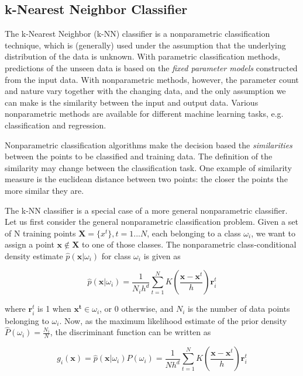 \subsection{k-Nearest Neighbor Classifier}
The k-Nearest Neighbor (k-NN) classifier is a nonparametric classification technique, which is (generally) used under the assumption that the underlying distribution of the data is unknown. With parametric classification methods, predictions of the unseen data is based on the \emph{fixed parameter models} constructed from the input data. With nonparametric methods, however, the parameter count and nature vary together with the changing data, and the only assumption we can make is the similarity between the input and output data. Various nonparametric methods are available for different machine learning tasks, e.g. classification and regression. \cite{alpaydin:2004:introduction} %

Nonparametric classification algorithms make the decision based the \emph{similarities} between the points to be classified and training data. The definition of the similarity may change between the classification task. One example of similarity measure is the euclidean distance between two points: the closer the points the more similar they are.

The k-NN classifier is a special case of a more general nonparametric classifier. Let us first consider the general nonparametric classification problem. Given a set of N training points  $\mathbf{X} = \{x^{t}\}, t=1...N$, each belonging to a class $\omega_{i}$, we want to assign a point $\mathbf{x} \notin \mathbf{X}$ to one of those classes. The nonparametric class-conditional density estimate $\hat{p}(\mathbf{x} | \omega_{i})$ for class $\omega_{i}$ is given as

\begin{equation*}
  \label{eq:1}
  \hat{p}(\mathbf{x} | \omega_{i}) = \frac{1}{N_{i}h^{d}} \sum_{t=1}^{N}K(\frac{\mathbf{x} - \mathbf{x}^{t}}{h})\mathbf{r}_{i}^{t}
\end{equation*}

where $\mathbf{r}_{i}^{t}$ is 1 when $\mathbf{x^t} \in \omega_{i}$, or 0 otherwise, and $N_{i}$ is the number of data points belonging to $\omega_{i}$. Now, as the maximum likelihood estimate of the prior density $\hat{P}(\omega_{i}) = \frac{N_{i}}{N}$, the discriminant function can be written as

\begin{equation*}
  \label{eq:2}
  g_{i}(\mathbf{x}) = \hat{p}(\mathbf{x}|\omega_{i}) \hat{P}(\omega_{i})
                    = \frac{1}{Nh^{d}} \sum_{t=1}^{N}K(\frac{\mathbf{x} - \mathbf{x}^{t}}{h})\mathbf{r}_{i}^{t}
\end{equation*}

